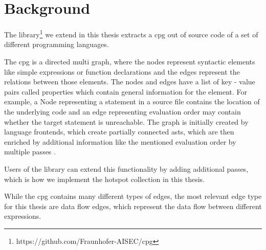 \chapter{Background}
\label{chapter:Background}
\iffalse
What is the knowledge a undergrad student needs so that he/she can understand
your thesis? You can assume some familiarity with the very broad topic. E.g. if
you write a thesis in the area of software analysis, you do not have to explain
static/dynamic analysis as such (this is boring!). If you're a crypto guy, don't
explain AES in detail unless you try to break it in your thesis. If I stumble
across a word/term in your thesis and don't understand it, this is where I would
look it up (or on google).

Probably approx. 3-10 pages

\fi 

The library\footnote{https://github.com/Fraunhofer-AISEC/cpg} we extend in this thesis extracts a \ac{cpg} out of source code of a set of different programming languages.

The \ac{cpg} is a directed multi graph, where the nodes represent syntactic elements like simple expressions or function declarations and the edges represent the relations between those elements. The nodes and edges have a list of key - value pairs called properties which contain general information for the element. For example, a Node representing a statement in a source file contains the location of the underlying code and an edge representing evaluation order may contain whether the target statement is unreachable. The graph is initially created by language frontends, which create partially connected \acp{ast}, which are then enriched by additional information like the mentioned evaluation order by multiple passes \cite{cpg}.

Users of the library can extend this functionality by adding additional passes, which is how we implement the hotspot collection in this thesis.


While the \ac{cpg} contains many different types of edges, the most relevant edge type for this thesis are data flow edges, which represent the data flow between different expressions.

